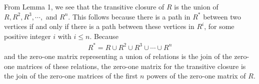 \documentclass{report}
\begin{document}


From Lemma 1, we see that the transitive closure of $R$ is the union of $R,R^2,R^3,\cdots,$ and
$R^n$. This follows because there is a path in $R^*$ between two vertices if and only if there is
a path between these vertices in $R^i$, for some positive integer $i$ with $i\leq n$. Because
\begin{align*}
    R^*=R\cup R^2\cup R^3\cup \cdots \cup R^n
\end{align*}
and the zero-one matrix representing a union of relations is the join of the zero-one matrices of these relations,
the zero-one matrix for the transitive closure is the join of the zero-one matrices of the first
$n$ powers of the zero-one matrix of $R$.
\end{document}
